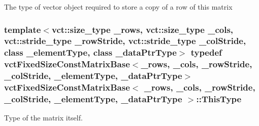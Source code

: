 The type of vector object required to store a copy of a row of this matrix \hypertarget{classvct_fixed_size_const_matrix_base_a7ec66a96ed7e08ce9ff54093133c9d8d}{
\subsubsection[{This\-Type}]{\setlength{\rightskip}{0pt plus 5cm}template$<$vct\-::size\-\_\-type \-\_\-rows, vct\-::size\-\_\-type \-\_\-cols, vct\-::stride\-\_\-type \-\_\-row\-Stride, vct\-::stride\-\_\-type \-\_\-col\-Stride, class \-\_\-element\-Type, class \-\_\-data\-Ptr\-Type$>$ typedef {\bf vct\-Fixed\-Size\-Const\-Matrix\-Base}$<$\-\_\-rows, \-\_\-cols, \-\_\-row\-Stride, \-\_\-col\-Stride, \-\_\-element\-Type, \-\_\-data\-Ptr\-Type$>$ {\bf vct\-Fixed\-Size\-Const\-Matrix\-Base}$<$ \-\_\-rows, \-\_\-cols, \-\_\-row\-Stride, \-\_\-col\-Stride, \-\_\-element\-Type, \-\_\-data\-Ptr\-Type $>$\-::{\bf This\-Type}}}\label{classvct_fixed_size_const_matrix_base_a7ec66a96ed7e08ce9ff54093133c9d8d}
Type of the matrix itself. 

